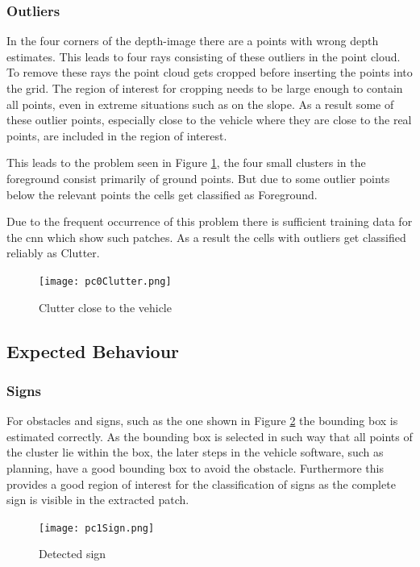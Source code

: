 \subsubsection{Outliers} \label{sec:eval:outlier}
In the four corners of the depth-image there are a points with wrong depth estimates.
This leads to four rays consisting of these outliers in the point cloud. 
To remove these rays the point cloud gets cropped before inserting the points into the grid. 
The region of interest for cropping needs to be large enough to contain all points, even in extreme situations such as on the slope.
As a result some of these outlier points, especially close to the vehicle where they are close to the real points, are included in the region of interest.

This leads to the problem seen in Figure \ref{fig:eval:pc0Clutter}, the four small clusters in the foreground consist primarily of ground points.
But due to some outlier points below the relevant points the cells get classified as Foreground.

Due to the frequent occurrence of this problem there is sufficient training data for the \ac{cnn} which show such patches. As a result the cells with outliers get classified reliably as Clutter.
\begin{figure}[h!]
    \centering
    \texttt{[image: pc0Clutter.png]}
    \caption{Clutter close to the vehicle}
    \label{fig:eval:pc0Clutter}
\end{figure}

\subsection{Expected Behaviour}
\subsubsection{Signs}
For obstacles and signs, such as the one shown in Figure \ref{fig:eval:pc1Sign} the bounding box is estimated correctly. 
As the bounding box is selected in such way that all points of the cluster lie within the box,
the later steps in the vehicle software, such as planning, have a good bounding box to avoid the obstacle.
Furthermore this provides a good region of interest for the classification of signs as the complete sign is visible in the extracted patch.

\begin{figure}[h!]
    \centering
    \texttt{[image: pc1Sign.png]}
    \caption{Detected sign}
    \label{fig:eval:pc1Sign}
\end{figure}

